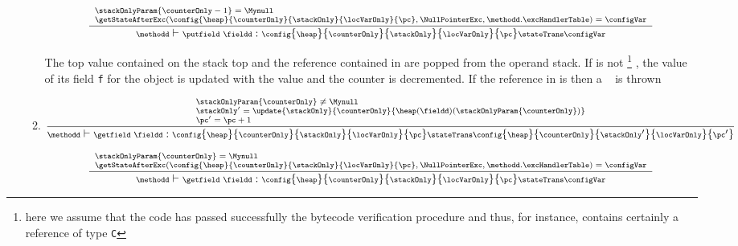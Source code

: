 \begin{itemize}
\begin{enumerate}
		     
	    
           $${\scriptsize \frac{ \begin{array}{l}
	                 \stackOnlyParam{\counterOnly - 1} = \Mynull   \\
		         \getStateAfterExc( \config{\heap}{\counterOnly}{\stackOnly}{\locVarOnly}{\pc}, \NullPointerExc, \methodd.\excHandlerTable ) =  \configVar			                  \end{array}
                      }
		      {\methodd \vdash  \putfield \ \fieldd:  \config{\heap}{\counterOnly}{\stackOnly}{\locVarOnly}{\pc} 
					          \stateTrans  
						  \configVar }} $$
						        
        The top value contained on the stack top \stackOnlyParam{\counterOnly} and the reference contained in  
	are popped from the operand stack. If  is not \Mynull \footnote{here we assume that the code has passed successfully the bytecode verification procedure and thus,
	for instance,  contains certainly a reference        of type \texttt{C}  } , the value of its field 
	\texttt{f} for the object  is updated 
	with the value\stackOnlyParam{\counterOnly} and the counter \counterOnly is decremented.
	If the reference in  is \Mynull then a \NullPointerExc~ is thrown
          
        \item \getfield  
        	  
         $$ {\scriptsize \frac{ \begin{array}{l}
                               \stackOnlyParam{\counterOnly} \neq \Mynull \\
			             \stackOnly' =  \update{\stackOnly}{\counterOnly}{ \heap(\fieldd)(\stackOnlyParam{\counterOnly} ) }\\
			             \pc' = \pc + 1
	             \end{array}
                 }   
		 {\methodd \vdash  \getfield \ \fieldd  :  \config{\heap}{\counterOnly}{\stackOnly}{\locVarOnly}{\pc} 
						 \stateTrans  
						 \config{\heap}{\counterOnly}{\stackOnly'}{\locVarOnly}{\pc'}} } $$
			


        $${\scriptsize  \frac{ \begin{array}{l}
	                      \stackOnlyParam{\counterOnly} = \Mynull \\
			       \getStateAfterExc( \config{\heap}{\counterOnly}{\stackOnly}{\locVarOnly}{\pc}, \NullPointerExc, \methodd.\excHandlerTable ) =  \configVar                              \end{array}}
		  {\methodd \vdash  \getfield \ \fieldd  :  \config{\heap}{\counterOnly}{\stackOnly}{\locVarOnly}{\pc} 
						 \stateTrans  
						 \configVar} }$$
	 

\end{enumerate}
\end{itemize}
